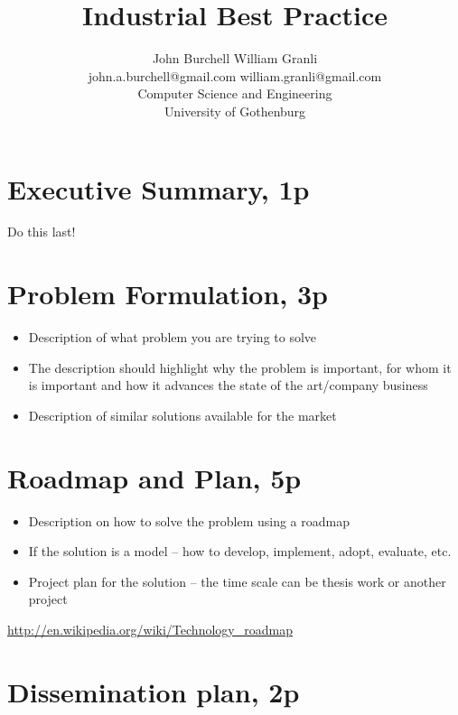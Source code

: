 \documentclass{article}
\title{Industrial Best Practice}
\begin{document}
\author{John Burchell \qquad William Granli \\
		john.a.burchell@gmail.com \qquad william.granli@gmail.com \\
		Computer Science and Engineering  \\
		University of Gothenburg }



\maketitle
\section{Executive Summary, 1p}
Do this last! 

\section{Problem Formulation, 3p}

\begin{itemize}
	\item Description of what problem you are trying to solve
	\item The description should highlight why the problem is important, for whom it is important and how it advances the state of the art/company business
	\item Description of similar solutions available for the market
\end{itemize}

\section{Roadmap and Plan, 5p}

\begin{itemize}
	\item Description on how to solve the problem using a roadmap
	\item If the solution is a model – how to develop, implement, adopt, evaluate, etc.
	\item Project plan for the solution – the time scale can be thesis work or another project
\end{itemize}

\url{http://en.wikipedia.org/wiki/Technology_roadmap}

\section{Dissemination plan, 2p}
\end{document}

